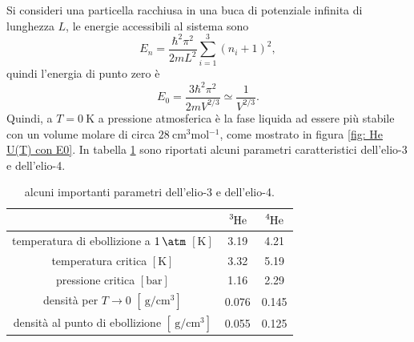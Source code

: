 Si consideri una particella racchiusa in una buca di potenziale infinita di lunghezza $L$, le energie accessibili al sistema sono
\begin{equation}
    E_n = \frac{\hbar^2\pi^2}{2mL^2}\sum_{i=1}^3(n_i+1)^2,
\end{equation}
quindi l'energia di punto zero è 
\begin{equation}
    E_0 = \frac{3\hbar^2\pi^2}{2mV^{2/3}} \simeq \frac{1}{V^{2/3}}.
\end{equation}
Quindi, a $T = \SI{0}{\kelvin}$ a pressione atmosferica è la fase liquida ad essere più stabile con un volume molare di circa $\SI{28}{\centi\meter\cubed\mol^{-1}}$, come mostrato in figura \ref{fig: He U(T) con E0}. In tabella \ref{tab: parametri del 3He e 4He} sono riportati alcuni parametri caratteristici dell'elio-3 e dell'elio-4.
\begin{table}[h]
    \centering
    \begin{tabular}{|c|cc|}
         \hline 
         & $\ce{^3He}$ & $\ce{^4He}$ \\ \hline
         temperatura di ebollizione a $\SI{1}{\atm}$ $[\mathrm{K}]$ & 3.19 & 4.21 \\
         temperatura critica $[\mathrm{K}]$ & 3.32 & 5.19 \\
         pressione critica $[\mathrm{bar}]$ & 1.16 & 2.29 \\
         densità per $T \to 0$ $[\SI{}{\gram\per\centi\meter\cubed}]$ & 0.076 & 0.145 \\
         densità al punto di ebollizione $[\SI{}{\gram\per\centi\meter\cubed}]$ & 0.055 & 0.125 \\ \hline
    \end{tabular}
    \caption{alcuni importanti parametri dell'elio-3 e dell'elio-4.}
    \label{tab: parametri del 3He e 4He}
\end{table}

